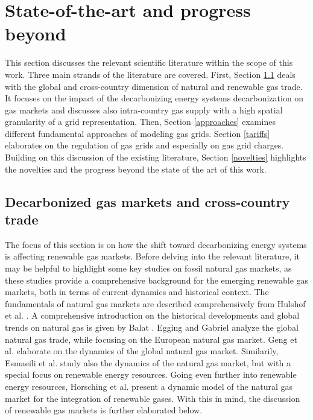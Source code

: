 \section{State-of-the-art and progress beyond}\label{stateoftheart}
This section discusses the relevant scientific literature within the scope of this work. Three main strands of the literature are covered. First, Section \ref{import} deals with the global and cross-country dimension of natural and renewable gas trade. It focuses on the impact of the decarbonizing energy systems decarbonization on gas markets and discusses also intra-country gas supply with a high spatial granularity of a grid representation. Then, Section \ref{approaches} examines different fundamental approaches of modeling gas grids. Section \ref{tariffs} elaborates on the regulation of gas grids and especially on gas grid charges. Building on this discussion of the existing literature, Section \ref{novelties} highlights the novelties and the progress beyond the state of the art of this work.

\subsection{Decarbonized gas markets and cross-country trade}\label{import}
The focus of this section is on how the shift toward decarbonizing energy systems is affecting renewable gas markets. Before delving into the relevant literature, it may be helpful to highlight some key studies on fossil natural gas markets, as these studies provide a comprehensive background for the emerging renewable gas markets, both in terms of current dynamics and historical context. The fundamentals of natural gas markets are described comprehensively from Hulshof et al. \cite{hulshof2016market}. A comprehensive introduction on the historical developments and global trends on natural gas is given by  Balat \cite{balat2009global}. Egging and Gabriel \cite{egging2006examining} analyze the global natural gas trade, while focusing on the European natural gas market. Geng et al. \cite{geng2014dynamic} elaborate on the dynamics of the global natural gas market. Similarily, Esmaeili et al. \cite{esmaeili2022system} study also the dynamics of the natural gas market, but with a special focus on renewable energy resources. Going even further into renewable energy resources, Horsching et al. \cite{horschig2018decarbonize} present a dynamic model of the natural gas market for the integration of renewable gases. With this in mind, the discussion of renewable gas markets is further elaborated below.\vspace{0.3cm}

